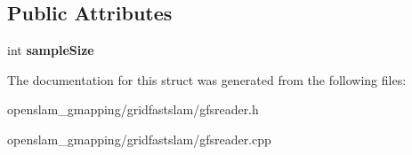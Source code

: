 \subsection*{Public Attributes}
\begin{DoxyCompactItemize}
\item 
\mbox{\label{structGMapping_1_1GFSReader_1_1RecordList_a6171d5fbb549cedca190082997ce243b}} 
int {\bfseries sample\+Size}
\end{DoxyCompactItemize}


The documentation for this struct was generated from the following files\+:\begin{DoxyCompactItemize}
\item 
openslam\+\_\+gmapping/gridfastslam/gfsreader.\+h\item 
openslam\+\_\+gmapping/gridfastslam/gfsreader.\+cpp\end{DoxyCompactItemize}
